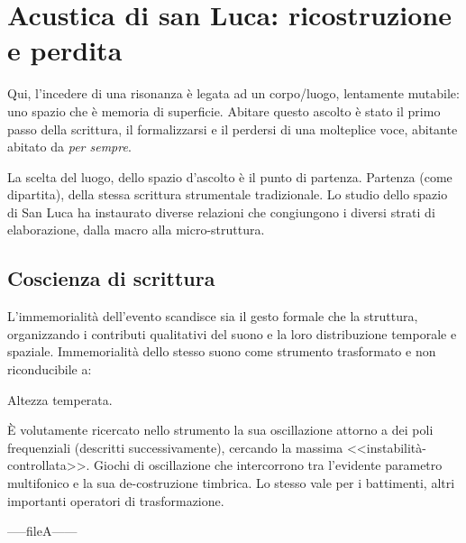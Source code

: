 
\chapter{Acustica di san Luca: ricostruzione e perdita}
\label{cap:acustica}

\begin{flushright}{\slshape
  L'enigma che risuona dalle mascelli feroci della vergine \\
  \medskip
    --- Pindaro
\end{flushright}

%
%
%
%
Qui, l’incedere di una risonanza è legata ad un corpo/luogo, lentamente mutabile:
uno spazio che è memoria di superficie. Abitare questo ascolto è stato il primo
passo della scrittura, il formalizzarsi e il perdersi di una molteplice voce,
abitante abitato da \emph{per sempre}. 

La scelta del luogo, dello spazio d'ascolto è il punto di partenza.
Partenza (come dipartita), della stessa scrittura strumentale tradizionale. 
Lo studio dello spazio di San Luca ha instaurato diverse relazioni che
congiungono i diversi strati di elaborazione, dalla macro alla micro-struttura.
%
%
%
%
%
\section{Coscienza di scrittura}

L'immemorialità dell'evento scandisce sia il gesto formale che la struttura,
organizzando i contributi qualitativi del suono e la loro distribuzione
temporale e spaziale. Immemorialità dello stesso suono come strumento trasformato
e non riconducibile a:

Altezza temperata.

È volutamente ricercato nello strumento la sua oscillazione  attorno a dei
poli frequenziali (descritti successivamente), cercando la massima <<instabilità-controllata>>.
Giochi di oscillazione che intercorrono tra l’evidente parametro multifonico e la sua de-costruzione timbrica.
Lo stesso vale per i battimenti, altri importanti operatori di trasformazione.


-----fileA------



